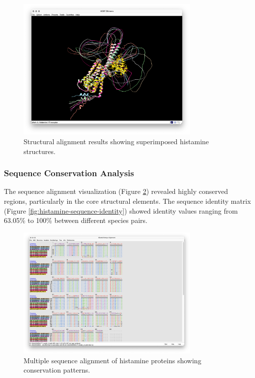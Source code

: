 \documentclass[11pt, a4paper, hidelinks]{article}
\begin{document}
\begin{figure}[H]
    \centering
    \includegraphics[width=0.8\textwidth]{CAA84380.1/_img/match maker results}
    \caption{Structural alignment results showing superimposed histamine structures.}
    \label{fig:histamine-alignment-results}
\end{figure}

\subsubsection{Sequence Conservation Analysis}\label{subsubsec:histamine-conservation}
The sequence alignment visualization (Figure \ref{fig:histamine-sequence-alignment}) revealed highly conserved regions, particularly in the core structural elements. The sequence identity matrix (Figure \ref{fig:histamine-sequence-identity}) showed identity values ranging from 63.05\% to 100\% between different species pairs.

\begin{figure}[H]
    \centering
    \includegraphics[width=0.8\textwidth]{CAA84380.1/_img/seq alignment results}
    \caption{Multiple sequence alignment of histamine proteins showing conservation patterns.}
    \label{fig:histamine-sequence-alignment}
\end{figure}
\end{document}
